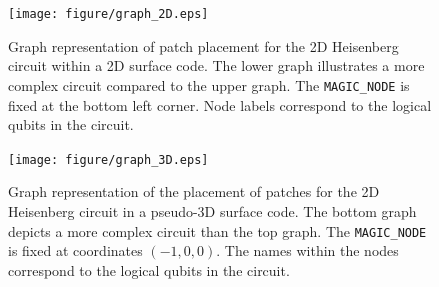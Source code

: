 \documentclass[a4paper,11pt]{ltjsarticle}
\begin{document}
{    \begin{figure}[h]
        \centering
        \texttt{[image: figure/graph\_2D.eps]}
        \vspace{0pt}\caption{Graph representation of patch placement for the 2D Heisenberg circuit within a 2D surface code. The lower graph illustrates a more complex circuit compared to the upper graph. The \texttt{MAGIC\_NODE} is fixed at the bottom left corner. Node labels correspond to the logical qubits in the circuit.}
        \label{graph_2D}
        \texttt{[image: figure/graph\_3D.eps]}
        \vspace{-10pt}\caption{Graph representation of the placement of patches for the 2D Heisenberg circuit in a pseudo-3D surface code. The bottom graph depicts a more complex circuit than the top graph. The \texttt{MAGIC\_NODE} is fixed at coordinates $(-1, 0, 0)$. The names within the nodes correspond to the logical qubits in the circuit.}
        \label{graph_3D}
    \end{figure}
}
\end{document}
